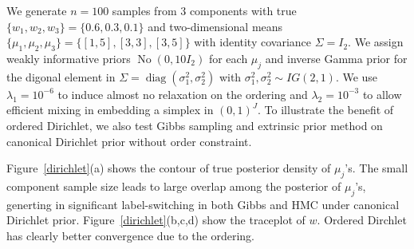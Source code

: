\documentclass[10pt]{article}
\DeclareMathOperator{\No}{No}
\DeclareMathOperator{\diag}{diag}
\DeclareMathOperator{\1}{\mathbbm{1}}
\begin{document}
We generate $n=100$ samples from $3$ components with true $\{w_1,w_2,w_3\}=\{0.6,0.3,0.1\}$ and two-dimensional means $\{\mu_1,\mu_2,\mu_3\} = \{[1,5], [3,3], [3,5]\}$ with identity covariance $\Sigma = I_2$. We assign weakly informative priors $\No(0,10 I_2)$ for each $\mu_j$ and inverse Gamma prior for the digonal element in $\Sigma=\diag(\sigma_1^2,\sigma_2^2)$ with $\sigma^2_1, \sigma^2_2\sim IG(2,1)$. We use $\lambda_1 = 10^{-6}$ to induce almost no relaxation on the ordering and $\lambda_2 = 10^{-3}$ to allow efficient mixing in embedding a simplex in $(0,1)^J$. To illustrate the benefit of ordered Dirichlet, we also test Gibbs sampling and extrinsic prior method on canonical Dirichlet prior without order constraint.

Figure~\ref{dirichlet}(a) shows the contour of true posterior density of $\mu_j$'s. The small component sample size leads to large overlap among the posterior of $\mu_j$'s, generting in significant label-switching in both Gibbs and HMC under canonical Dirichlet prior. Figure~\ref{dirichlet}(b,c,d) show the traceplot of $w$. Ordered Dirchlet has clearly better convergence due to the ordering.
\end{document}
